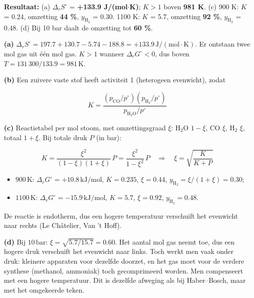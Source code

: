 \begin{oplossing}
\textbf{Resultaat:} (a) \(\Delta_r S^\circ\) = \textbf{+133.9 J/(mol\ensuremath{\cdot{}}K)}; \(K > 1\) boven \textbf{981 K}. (c) 900 K: \(K\) = 0.24, omzetting \textbf{44 \%}, \(y_{\mathrm{H_2}}\) = 0.30. 1100 K: \(K\) = 5.7, omzetting \textbf{92 \%}, \(y_{\mathrm{H_2}}\) = 0.48. (d) Bij 10 bar daalt de omzetting tot \textbf{60 \%}.

\textbf{(a)} \(\Delta_r S^\circ = 197.7 + 130.7 - 5.74 - 188.8 = +133.9\,\mathrm{J/(mol\cdot K)}\). Er ontstaan twee mol gas uit één mol gas. \(K > 1\) wanneer \(\Delta_r G^\circ < 0\), dus boven \(T = 131\,300/133.9 = 981\,\mathrm{K}\).

\textbf{(b)} Een zuivere vaste stof heeft activiteit 1 (heterogeen evenwicht), zodat

\[
K = \frac{(p_{\mathrm{CO}}/p^\circ)(p_{\mathrm{H_2}}/p^\circ)}{p_{\mathrm{H_2O}}/p^\circ}
\]

\textbf{(c)} Reactietabel per mol stoom, met omzettingsgraad \(\xi\): \(\mathrm{H_2O}\) \(1-\xi\), \(\mathrm{CO}\) \(\xi\), \(\mathrm{H_2}\) \(\xi\), totaal \(1+\xi\). Bij totale druk \(P\) (in bar):

\[
K = \frac{\xi^2}{(1-\xi)(1+\xi)}\,P = \frac{\xi^2}{1-\xi^2}\,P \quad\Rightarrow\quad \xi = \sqrt{\frac{K}{K+P}}
\]

\begin{itemize}
\item
  \(900\,\mathrm{K}\): \(\Delta_r G^\circ = +10.8\,\mathrm{kJ/mol}\), \(K = 0.235\), \(\xi = 0.44\), \(y_{\mathrm{H_2}} = \xi/(1+\xi) = 0.30\);
\item
  \(1100\,\mathrm{K}\): \(\Delta_r G^\circ = -15.9\,\mathrm{kJ/mol}\), \(K = 5.7\), \(\xi = 0.92\), \(y_{\mathrm{H_2}} = 0.48\).
\end{itemize}

De reactie is endotherm, dus een hogere temperatuur verschuift het evenwicht naar rechts (Le Châtelier, Van 't Hoff).

\textbf{(d)} Bij \(10\,\mathrm{bar}\): \(\xi = \sqrt{5.7/15.7} = 0.60\). Het aantal mol gas neemt toe, dus een hogere druk verschuift het evenwicht naar links. Toch werkt men vaak onder druk: kleinere apparaten voor dezelfde doorzet, en het gas moet voor de verdere synthese (methanol, ammoniak) toch gecomprimeerd worden. Men compenseert met een hogere temperatuur. Dit is dezelfde afweging als bij Haber--Bosch, maar met het omgekeerde teken.
\end{oplossing}

